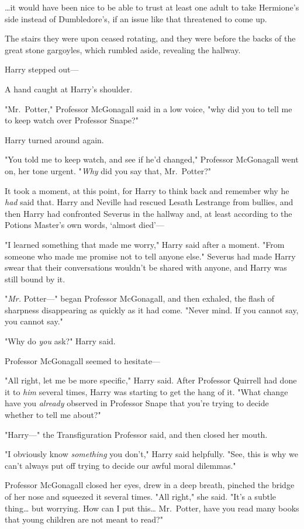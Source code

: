 {\ldots}it would have been nice to be able to trust at least one adult to take
Hermione's side instead of Dumbledore's, if an issue like that threatened to
come up.

The stairs they were upon ceased rotating, and they were before the backs of
the great stone gargoyles, which rumbled aside, revealing the hallway.

Harry stepped out---

A hand caught at Harry's shoulder.

"Mr.~Potter," Professor McGonagall said in a low voice, "why did you to tell me
to keep watch over Professor Snape?"

Harry turned around again.

"You told me to keep watch, and see if he'd changed," Professor McGonagall went
on, her tone urgent. "\emph{Why} did you say that, Mr.~Potter?"

It took a moment, at this point, for Harry to think back and remember why he
\emph{had} said that. Harry and Neville had rescued Lesath Lestrange from
bullies, and then Harry had confronted Severus in the hallway and, at least
according to the Potions Master's own words, `almost died'---

"I learned something that made me worry," Harry said after a moment. "From
someone who made me promise not to tell anyone else." Severus had made Harry
swear that their conversations wouldn't be shared with anyone, and Harry was
still bound by it.

"\emph{Mr.} Potter---" began Professor McGonagall, and then exhaled, the flash
of sharpness disappearing as quickly as it had come. "Never mind. If you cannot
say, you cannot say."

"Why do \emph{you} ask?" Harry said.

Professor McGonagall seemed to hesitate---

"All right, let me be more specific," Harry said. After Professor Quirrell had
done it to \emph{him} several times, Harry was starting to get the hang of it.
"What change have you \emph{already} observed in Professor Snape that you're
trying to decide whether to tell me about?"

"Harry---" the Transfiguration Professor said, and then closed her mouth.

"I obviously know \emph{something} you don't," Harry said helpfully. "See, this
is why we can't always put off trying to decide our awful moral dilemmas."

Professor McGonagall closed her eyes, drew in a deep breath, pinched the bridge
of her nose and squeezed it several times. "All right," she said. "It's a
subtle thing{\ldots} but worrying. How can I put this{\ldots} Mr.~Potter, have
you read many books that young children are not meant to read?"

